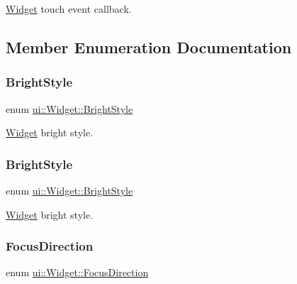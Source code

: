 \hyperlink{classui_1_1Widget}{Widget} touch event callback. 

\subsection{Member Enumeration Documentation}
\mbox{\label{classui_1_1Widget_a4040e89d49e005b771ac8a80a13206fc}} 
\subsubsection{\texorpdfstring{Bright\+Style}{BrightStyle}\hspace{0.1cm}{\footnotesize\ttfamily [1/2]}}
{\footnotesize\ttfamily enum \hyperlink{classui_1_1Widget_a4040e89d49e005b771ac8a80a13206fc}{ui\+::\+Widget\+::\+Bright\+Style}\hspace{0.3cm}{\ttfamily [strong]}}

\hyperlink{classui_1_1Widget}{Widget} bright style. \mbox{\label{classui_1_1Widget_a4040e89d49e005b771ac8a80a13206fc}} 
\subsubsection{\texorpdfstring{Bright\+Style}{BrightStyle}\hspace{0.1cm}{\footnotesize\ttfamily [2/2]}}
{\footnotesize\ttfamily enum \hyperlink{classui_1_1Widget_a4040e89d49e005b771ac8a80a13206fc}{ui\+::\+Widget\+::\+Bright\+Style}\hspace{0.3cm}{\ttfamily [strong]}}

\hyperlink{classui_1_1Widget}{Widget} bright style. \mbox{\label{classui_1_1Widget_a8ae8e8fc793a04a87584205cd1e8a8a5}} 
\subsubsection{\texorpdfstring{Focus\+Direction}{FocusDirection}\hspace{0.1cm}{\footnotesize\ttfamily [1/2]}}
{\footnotesize\ttfamily enum \hyperlink{classui_1_1Widget_a8ae8e8fc793a04a87584205cd1e8a8a5}{ui\+::\+Widget\+::\+Focus\+Direction}\hspace{0.3cm}{\ttfamily [strong]}}


